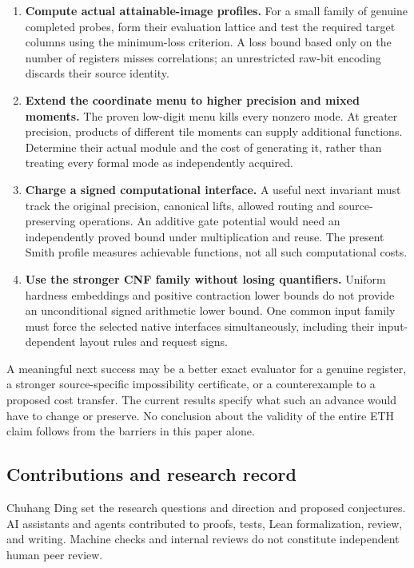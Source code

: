 \documentclass[11pt,a4paper]{article}
\providecommand{\tightlist}{\setlength{\itemsep}{0pt}\setlength{\parskip}{0pt}}
\begin{document}
\begin{enumerate}
\def\labelenumi{\arabic{enumi}.}
\tightlist
\item
  \textbf{Compute actual attainable-image profiles.} For a small family
  of genuine completed probes, form their evaluation lattice and test
  the required target columns using the minimum-loss criterion. A loss
  bound based only on the number of registers misses correlations; an
  unrestricted raw-bit encoding discards their source identity.
\item
  \textbf{Extend the coordinate menu to higher precision and mixed
  moments.} The proven low-digit menu kills every nonzero mode. At
  greater precision, products of different tile moments can supply
  additional functions. Determine their actual module and the cost of
  generating it, rather than treating every formal mode as independently
  acquired.
\item
  \textbf{Charge a signed computational interface.} A useful next
  invariant must track the original precision, canonical lifts, allowed
  routing and source-preserving operations. An additive gate potential
  would need an independently proved bound under multiplication and
  reuse. The present Smith profile measures achievable functions, not
  all such computational costs.
\item
  \textbf{Use the stronger CNF family without losing quantifiers.}
  Uniform hardness embeddings and positive contraction lower bounds do
  not provide an unconditional signed arithmetic lower bound. One common
  input family must force the selected native interfaces simultaneously,
  including their input-dependent layout rules and request signs.
\end{enumerate}

A meaningful next success may be a better exact evaluator for a genuine
register, a stronger source-specific impossibility certificate, or a
counterexample to a proposed cost transfer. The current results specify
what such an advance would have to change or preserve. No conclusion
about the validity of the entire ETH claim follows from the barriers in
this paper alone.

\subsection{Contributions and research
record}\label{v8-contributions-and-research-record}

Chuhang Ding set the research questions and direction and proposed conjectures. AI assistants and agents contributed to proofs, tests, Lean formalization, review, and writing. Machine checks and internal reviews do not constitute independent human peer review.
\end{document}
